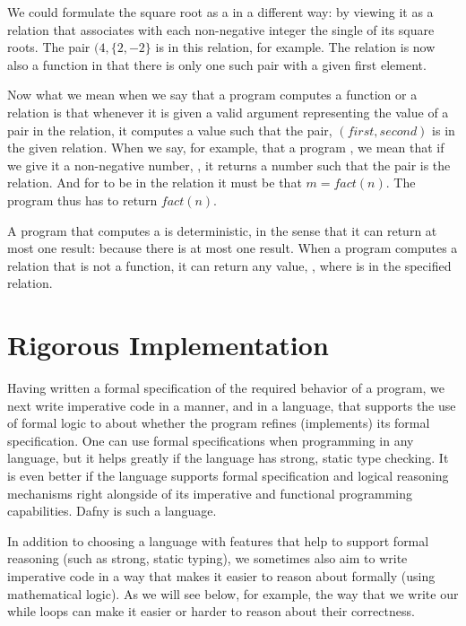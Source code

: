 \documentclass[letterpaper,10pt,english]{sphinxmanual}
\begin{document}
We could formulate the square root  as a  in a
different way: by viewing it as a relation that associates with each
non-negative integer the single  of its square roots. The pair
\((4, \{2, -2\}\) is in this relation, for example. The relation is
now also a function in that there is only one such pair with a given
first element.

Now what we mean when we say that a program computes a function or a
relation is that whenever it is given a valid argument representing
the  value of a pair in the relation, it computes a 
value such that the pair, \((first, second)\) is in the given
relation. When we say, for example, that a program , we mean that if we give it a non-negative number,
, it returns a number  such that the pair  is  the
relation. And for  to be in the relation it must be that
\(m = fact(n)\). The program thus has to return \(fact(n)\).

A program that computes a  is deterministic, in the sense
that it can return at most one result: because there is at most one
result. When a program computes a relation that is not a function, it
can return any value, , where  is in the specified relation.


\section{Rigorous Implementation}
\label{\detokenize{05-putting-it-together:rigorous-implementation}}
Having written a formal specification of the required 
behavior of a program, we next write imperative code in a manner, and
in a language, that supports the use of formal logic to  about
whether the program refines (implements) its formal specification. One
can use formal specifications when programming in any language, but it
helps greatly if the language has strong, static type checking. It is
even better if the language supports formal specification and logical
reasoning mechanisms right alongside of its imperative and functional
programming capabilities. Dafny is such a language.

In addition to choosing a language with features that help to support
formal reasoning (such as strong, static typing), we sometimes also
aim to write imperative code in a way that makes it easier to reason
about formally (using mathematical logic). As we will see below, for
example, the way that we write our while loops can make it easier or
harder to reason about their correctness.
\end{document}
